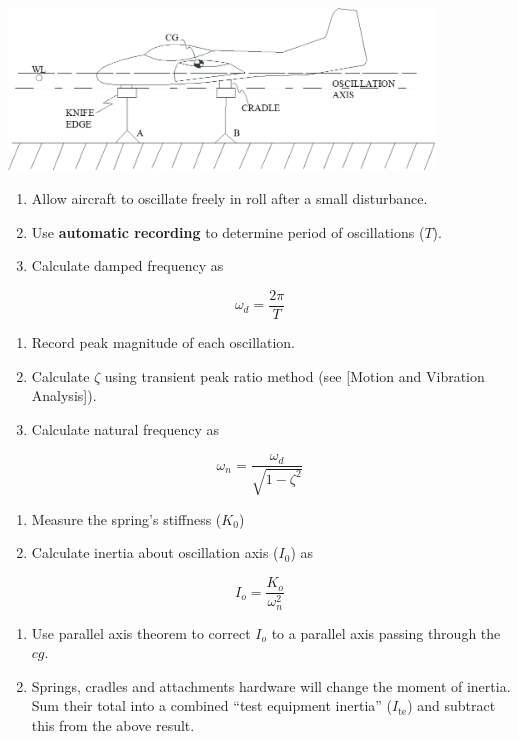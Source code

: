 \documentclass[
]{book}
\providecommand{\tightlist}{%
  \setlength{\itemsep}{0pt}\setlength{\parskip}{0pt}}
\begin{document}
\includegraphics[width=4.45278in,height=1.69375in]{media/07/image25.png}~

\begin{enumerate}
\def\labelenumi{\arabic{enumi}.}
\setcounter{enumi}{2}
\tightlist
\item
  Allow aircraft to oscillate freely in roll after a small disturbance.
\item
  Use \textbf{automatic recording} to determine period of oscillations (\(T\)).
\item
  Calculate damped frequency as
\end{enumerate}

\[ \omega_d = \frac{2\pi}{T} \]

\begin{enumerate}
\def\labelenumi{\arabic{enumi}.}
\setcounter{enumi}{5}
\tightlist
\item
  Record peak magnitude of each oscillation.
\item
  Calculate \(\zeta\) using transient peak ratio method (see {[}Motion and Vibration Analysis{]}).
\item
  Calculate natural frequency as
\end{enumerate}

\[ \omega_n = \frac{\omega_d}{\sqrt{1 - \zeta^2}} \]

\begin{enumerate}
\def\labelenumi{\arabic{enumi}.}
\setcounter{enumi}{8}
\tightlist
\item
  Measure the spring's stiffness (\(K_0\))
\item
  Calculate inertia about oscillation axis (\(I_0\)) as
\end{enumerate}

\[ I_o = \frac{K_o}{\omega_n^2} \]

\begin{enumerate}
\def\labelenumi{\arabic{enumi}.}
\setcounter{enumi}{10}
\tightlist
\item
  Use parallel axis theorem to correct \(I_o\) to a parallel axis passing through the \(cg\).
\item
  Springs, cradles and attachments hardware will change the moment of inertia. Sum their total into a combined ``test equipment inertia'' (\Delta\(I_{\mathrm{te}}\)) and subtract this from the above result.
\end{enumerate}
\end{document}
